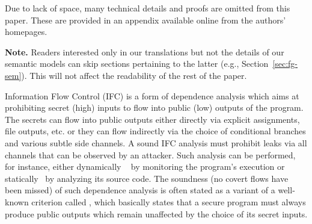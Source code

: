 Due to lack of space, many technical details and proofs are omitted
from this paper. These are provided in an appendix available online
from the authors' homepages.


\medskip
\noindent \textbf{Note.} Readers interested only in our translations
but not the details of our semantic models can skip sections
pertaining to the latter (e.g., Section~\ref{sec:fg-sem}). This will
not affect the readability of the rest of the paper.




Information Flow Control (IFC) is a form of dependence analysis which aims at prohibiting secret
(high) inputs to flow into public (low) outputs of the program. The secrets can flow into public
outputs either directly via explicit assignments, file outputs, etc. or they can flow indirectly via
the choice of conditional branches and various subtle side channels. A sound IFC analysis must
prohibit leaks via all channels that can be observed by an attacker. Such analysis can be performed,
for instance, either dynamically ~\cite{plas09-austinFlanagan, plas10-austinFlanagan} by monitoring
the program's execution or statically~\cite{toplas03-flowcaml,popl98-SLAM} by analyzing its source
code. The soundness (no covert flows have been missed) of such dependence analysis is often stated
as a variant of a well-known criterion called \NI, which basically states that a secure program must
always produce public outputs which remain unaffected by the choice of its secret inputs.


